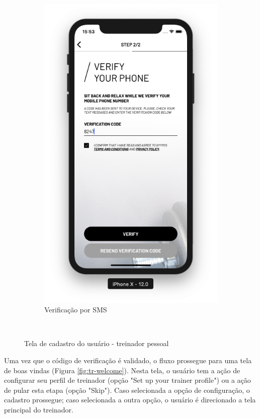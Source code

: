 \begin{figure}[H]
\begin{subfigure}[b]{0.4\textwidth}
        \includegraphics[width=\textwidth]{pfc/figuras/register-trainer-verification.png}
        \caption{Verificação por SMS}
        \label{fig:register-trainer-verification}
    \end{subfigure}
    ~
    \caption{Tela de cadastro do usuário - treinador pessoal}
    \label{fig:register-trainer}
\end{figure}

Uma vez que o código de verificação é validado, o fluxo prossegue para uma tela de boas vindas (Figura \ref{fig:tr-welcome}). Nesta tela, o usuário tem a ação de configurar seu perfil de treinador (opção "Set up your trainer profile") ou a ação de pular esta etapa (opção "Skip"). Caso selecionada a opção de configuração, o cadastro prossegue; caso selecionada a outra opção, o usuário é direcionado a tela principal do treinador.

